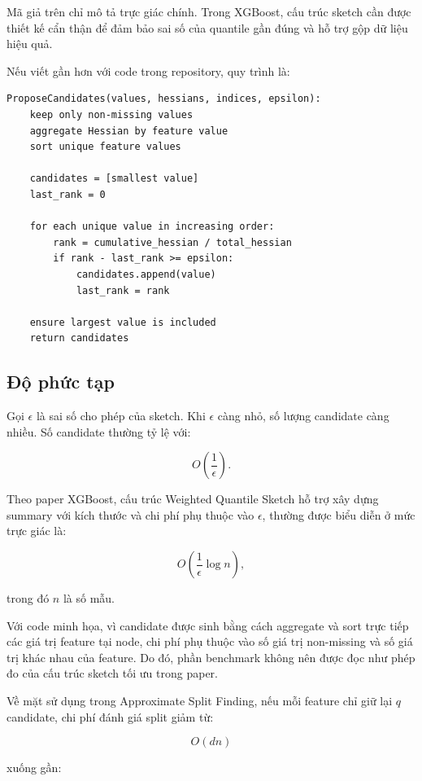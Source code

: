 Mã giả trên chỉ mô tả trực giác chính. Trong XGBoost, cấu trúc sketch cần được thiết kế cẩn thận để đảm bảo sai số của quantile gần đúng và hỗ trợ gộp dữ liệu hiệu quả.

Nếu viết gần hơn với code trong repository, quy trình là:

\begin{lstlisting}[style=pseudocode, caption={Sinh candidate trực tiếp trong code minh họa}, label={lst:direct_weighted_candidates}]
ProposeCandidates(values, hessians, indices, epsilon):
    keep only non-missing values
    aggregate Hessian by feature value
    sort unique feature values

    candidates = [smallest value]
    last_rank = 0

    for each unique value in increasing order:
        rank = cumulative_hessian / total_hessian
        if rank - last_rank >= epsilon:
            candidates.append(value)
            last_rank = rank

    ensure largest value is included
    return candidates
\end{lstlisting}

\subsection{Độ phức tạp}

Gọi $\epsilon$ là sai số cho phép của sketch. Khi $\epsilon$ càng nhỏ, số lượng candidate càng nhiều. Số candidate thường tỷ lệ với:

\[
O\left(\frac{1}{\epsilon}\right).
\]

Theo paper XGBoost, cấu trúc Weighted Quantile Sketch hỗ trợ xây dựng summary với kích thước và chi phí phụ thuộc vào $\epsilon$, thường được biểu diễn ở mức trực giác là:

\[
O\left(\frac{1}{\epsilon}\log n\right),
\]

trong đó $n$ là số mẫu.

Với code minh họa, vì candidate được sinh bằng cách aggregate và sort trực tiếp các giá trị feature tại node, chi phí phụ thuộc vào số giá trị non-missing và số giá trị khác nhau của feature. Do đó, phần benchmark không nên được đọc như phép đo của cấu trúc sketch tối ưu trong paper.

Về mặt sử dụng trong Approximate Split Finding, nếu mỗi feature chỉ giữ lại $q$ candidate, chi phí đánh giá split giảm từ:

\[
O(dn)
\]

xuống gần:


